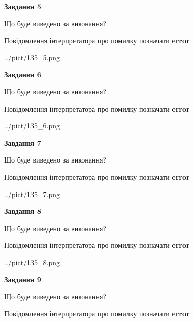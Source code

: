 \documentclass[11pt, ukrainian]{article}
\begin{document}
{\begin {large}
{\begin {center}\textbf{Завдання 5}\end {center}}\par
Що буде виведено за виконання? \par
Повідомлення інтерпретатора про помилку позначати \textbf{error}

\begin{center}
	{../pict/135_5.png}
\end{center}
\newpage

{\begin {center}\textbf{Завдання 6}\end {center}}\par
Що буде виведено за виконання? \par
Повідомлення інтерпретатора про помилку позначати \textbf{error}

\begin{center}
	{../pict/135_6.png}
\end{center}
\newpage

{\begin {center}\textbf{Завдання 7}\end {center}}\par
Що буде виведено за виконання? \par
Повідомлення інтерпретатора про помилку позначати \textbf{error}

\begin{center}
	{../pict/135_7.png}
\end{center}
\newpage

{\begin {center}\textbf{Завдання 8}\end {center}}\par
Що буде виведено за виконання? \par
Повідомлення інтерпретатора про помилку позначати \textbf{error}

\begin{center}
	{../pict/135_8.png}
\end{center}
\newpage

{\begin {center}\textbf{Завдання 9}\end {center}}\par
Що буде виведено за виконання? \par
Повідомлення інтерпретатора про помилку позначати \textbf{error}


\end{large}}
\end{document}
